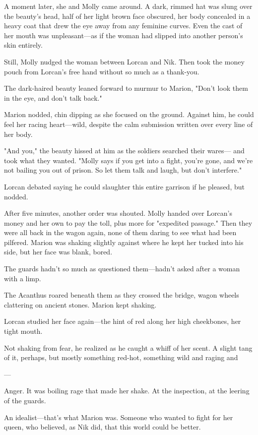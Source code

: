 A moment later, she and Molly came around. A dark, rimmed hat was slung over the beauty's head, half of her light brown face obscured, her body concealed in a heavy coat that drew the eye away from any feminine curves. Even the cast of her mouth was unpleasant---as if the woman had slipped into another person's skin entirely.

Still, Molly nudged the woman between Lorcan and Nik. Then took the money pouch from Lorcan's free hand without so much as a thank-you.

The dark-haired beauty leaned forward to murmur to Marion, "Don't look them in the eye, and don't talk back."

Marion nodded, chin dipping as she focused on the ground. Against him, he could feel her racing heart---wild, despite the calm submission written over every line of her body.

"And you," the beauty hissed at him as the soldiers searched their wares--- and took what they wanted. "Molly says if you get into a fight, you're gone, and we're not bailing you out of prison. So let them talk and laugh, but don't interfere."

Lorcan debated saying he could slaughter this entire garrison if he pleased, but nodded.

After five minutes, another order was shouted. Molly handed over Lorcan's money and her own to pay the toll, plus more for "expedited passage." Then they were all back in the wagon again, none of them daring to see what had been pilfered. Marion was shaking slightly against where he kept her tucked into his side, but her face was blank, bored.

The guards hadn't so much as questioned them---hadn't asked after a woman with a limp.

The Acanthus roared beneath them as they crossed the bridge, wagon wheels clattering on ancient stones. Marion kept shaking.

Lorcan studied her face again---the hint of red along her high cheekbones, her tight mouth.

Not shaking from fear, he realized as he caught a whiff of her scent. A slight tang of it, perhaps, but mostly something red-hot, something wild and raging and

---

Anger. It was boiling rage that made her shake. At the inspection, at the leering of the guards.

An idealist---that's what Marion was. Someone who wanted to fight for her queen, who believed, as Nik did, that this world could be better.

